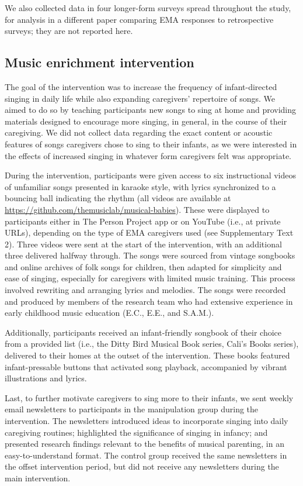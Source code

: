 \documentclass[
]{article}
\begin{document}
We also collected data in four longer-form surveys spread throughout the
study, for analysis in a different paper comparing EMA responses to
retrospective surveys; they are not reported here.

\subsection{Music enrichment
intervention}\label{music-enrichment-intervention}

The goal of the intervention was to increase the frequency of
infant-directed singing in daily life while also expanding caregivers'
repertoire of songs. We aimed to do so by teaching participants new
songs to sing at home and providing materials designed to encourage more
singing, in general, in the course of their caregiving. We did not
collect data regarding the exact content or acoustic features of songs
caregivers chose to sing to their infants, as we were interested in the
effects of increased singing in whatever form caregivers felt was
appropriate.

During the intervention, participants were given access to six
instructional videos of unfamiliar songs presented in karaoke style,
with lyrics synchronized to a bouncing ball indicating the rhythm (all
videos are available at
\url{https://github.com/themusiclab/musical-babies}). These were
displayed to participants either in The Person Project app or on YouTube
(i.e., at private URLs), depending on the type of EMA caregivers used
(see Supplementary Text 2). Three videos were sent at the start of the
intervention, with an additional three delivered halfway through. The
songs were sourced from vintage songbooks and online archives of folk
songs for children, then adapted for simplicity and ease of singing,
especially for caregivers with limited music training. This process
involved rewriting and arranging lyrics and melodies. The songs were
recorded and produced by members of the research team who had extensive
experience in early childhood music education (E.C., E.E., and S.A.M.).

Additionally, participants received an infant-friendly songbook of their
choice from a provided list (i.e., the Ditty Bird Musical Book series,
Cali's Books series), delivered to their homes at the outset of the
intervention. These books featured infant-pressable buttons that
activated song playback, accompanied by vibrant illustrations and
lyrics.

Last, to further motivate caregivers to sing more to their infants, we
sent weekly email newsletters to participants in the manipulation group
during the intervention. The newsletters introduced ideas to incorporate
singing into daily caregiving routines; highlighted the significance of
singing in infancy; and presented research findings relevant to the
benefits of musical parenting, in an easy-to-understand format. The
control group received the same newsletters in the offset intervention
period, but did not receive any newsletters during the main
intervention.
\end{document}
